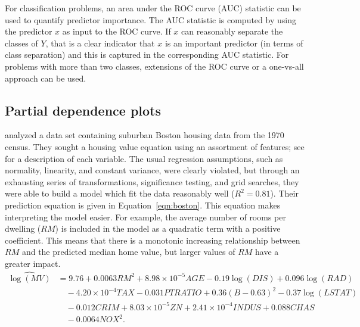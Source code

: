\documentclass[12pt]{article}
\begin{document}
For classification problems, an area under the ROC curve (AUC) statistic can be used to quantify predictor importance. The AUC statistic is computed by using the predictor $x$ as input to the ROC curve. If $x$ can reasonably separate the classes of $Y$, that is a clear indicator that $x$ is an important predictor (in terms of class separation) and this is captured in the corresponding AUC statistic. For problems with more than two classes, extensions of the ROC curve or a one-vs-all approach can be used.


\subsection{Partial dependence plots}

\citet{harrison-1978-hedonic} analyzed a data set containing suburban Boston housing data from the 1970 census. They sought a housing value equation using an assortment of features; see \citet[Table IV]{harrison-1978-hedonic} for a description of each variable. The usual regression assumptions, such as normality, linearity, and constant variance, were clearly violated, but through an exhausting series of transformations, significance testing, and grid searches, they were able to build a model which fit the data reasonably well ($R^2 = 0.81$). Their prediction equation is given in Equation~\eqref{eqn:boston}. This equation makes interpreting the model easier. For example, the average number of rooms per dwelling ($RM$) is included in the model as a quadratic term with a positive coefficient. This means that there is a monotonic increasing relationship between $RM$ and the predicted median home value, but larger values of $RM$ have a greater impact.
\begin{equation}
\label{eqn:boston}
\begin{aligned}
\widehat{\log\left(MV\right)} &= 9.76 + 0.0063 RM^2 + 8.98\times10^{-5} AGE - 0.19\log\left(DIS\right) + 0.096\log\left(RAD\right) \\
  & \quad - 4.20\times10^{-4} TAX - 0.031 PTRATIO + 0.36\left(B - 0.63\right)^2 - 0.37\log\left(LSTAT\right) \\
  & \quad - 0.012 CRIM + 8.03\times10^{-5} ZN + 2.41\times10^{-4} INDUS + 0.088 CHAS \\
  & \quad - 0.0064 NOX^2.
\end{aligned}
\end{equation}
\end{document}
